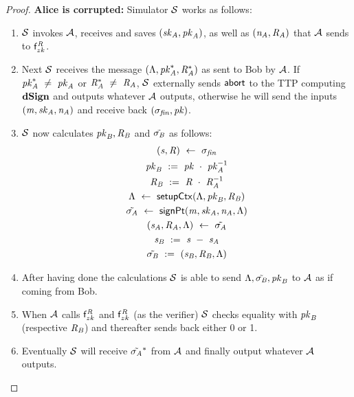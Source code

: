 \begin{proof}
    \textbf{Alice is corrupted: } Simulator $\mathcal{S}$ works as follows:
    \begin{enumerate}
        \item $\mathcal{S}$ invokes $\mathcal{A}$, receives and saves $(\mathit{sk}_{\mathit{A}}, \mathit{pk}_{\mathit{A}})$, as well as $(\mathit{\mathit{n}_{\mathit{A}}}, \mathit{R}_{\mathit{A}})$ that $\mathcal{A}$ sends to $\mathsf{f}^{\mathit{R}}_{zk}$.
        \item Next $\mathcal{S}$ receives the message $(\Lambda, \mathit{pk}_{\mathit{A}}^*, \mathit{R}_{\mathit{A}}^*)$ as sent to Bob by $\mathcal{A}$.
        If $\mathit{pk}_{\mathit{A}}^* ~\neq~ \mathit{pk}_{\mathit{A}}$ or $\mathit{R}_{\mathit{A}}^* ~\neq~ \mathit{R}_{\mathit{A}}$, $\mathcal{S}$ externally sends $\mathsf{abort}$ to the TTP computing $\mathbf{dSign}$ and outputs whatever $\mathcal{A}$ outputs, otherwise he will send the inputs $(\mathit{m}, \mathit{sk}_{\mathit{A}}, \mathit{\mathit{n}_{\mathit{A}}})$ and receive back $(\sigma_{\mathit{fin}}, \mathit{pk})$.
        \item $\mathcal{S}$ now calculates $\mathit{pk}_{\mathit{B}}, \mathit{R}_{\mathit{B}}$ and $\tilde{\sigma_{\mathit{B}}}$ as follows:
        \begin{gather*}
            (\mathit{s}, \mathit{R}) ~\leftarrow~ \sigma_{\mathit{fin}} \\
            \mathit{pk}_{\mathit{B}} ~:=~ \mathit{pk} ~\cdot~ \mathit{pk}_{\mathit{A}}^{-1} \\
            \mathit{R}_{\mathit{B}} ~:=~ \mathit{R} ~\cdot~ \mathit{R}_{\mathit{A}}^{-1} \\
            \Lambda ~\leftarrow~ \mathsf{setupCtx}( \Lambda, \mathit{pk}_{\mathit{B}}, \mathit{R}_{\mathit{B}} ) \\
            \tilde{\sigma_{\mathit{A}}} ~\leftarrow~ \mathsf{signPt}(\mathit{m}, \mathit{sk}_{\mathit{A}}, \mathit{\mathit{n}_{\mathit{A}}}, \Lambda) \\
            (\mathit{s}_{\mathit{A}}, \mathit{R}_{\mathit{A}}, \Lambda) ~\leftarrow~ \tilde{\sigma_{\mathit{A}}} \\
            \mathit{s}_{\mathit{B}} ~:=~ \mathit{s} ~-~ \mathit{s}_{\mathit{A}} \\
            \tilde{\sigma_{\mathit{B}}} ~:=~ (\mathit{s}_{\mathit{B}}, \mathit{R}_{\mathit{B}}, \Lambda)
        \end{gather*}
        \item After having done the calculations $\mathcal{S}$ is able to send $\Lambda, \tilde{\sigma_{\mathit{B}}}, \mathit{pk}_{\mathit{B}}$ to $\mathcal{A}$ as if coming from Bob.
        \item When $\mathcal{A}$ calls $\mathsf{f}^{\mathit{R}}_{zk}$ and $\mathsf{f}^{\mathit{R}}_{zk}$ (as the verifier) $\mathcal{S}$ checks equality with $\mathit{pk}_{\mathit{B}}$ (respective $\mathit{R}_{\mathit{B}}$) and thereafter sends back either 0 or 1.
        \item Eventually $\mathcal{S}$ will receive $\tilde{\sigma_{\mathit{A}}}^*$ from $\mathcal{A}$ and finally output whatever $\mathcal{A}$ outputs.
    \end{enumerate}


\end{proof}
